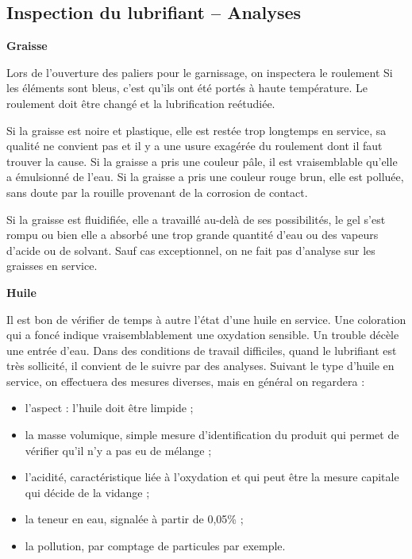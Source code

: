 \subsection{Inspection du lubrifiant – Analyses}

\vspace{0.3cm}
\textbf{	Graisse}
\vspace{0.3cm}

Lors de l’ouverture des paliers pour le garnissage, on inspectera le roulement
Si les éléments sont bleus, c’est qu’ils ont été portés à haute température. Le roulement doit être changé et la lubrification reétudiée.
\vspace{0.3cm}

Si la graisse est noire et plastique, elle est restée trop longtemps en service, sa qualité ne convient pas et il y a une usure exagérée du roulement dont il faut trouver la cause.
Si la graisse a pris une couleur pâle, il est vraisemblable qu’elle a émulsionné de l’eau.
Si la graisse a pris une couleur rouge brun, elle est polluée, sans doute par la rouille provenant de la corrosion de contact.
\vspace{0.3cm}

Si la graisse est fluidifiée, elle a travaillé au-delà de ses possibilités, le gel s’est rompu ou bien elle a absorbé une trop grande quantité d’eau ou des vapeurs d’acide ou de solvant.
Sauf cas exceptionnel, on ne fait pas d’analyse sur les graisses en service.


\vspace{0.3cm}
\textbf{	Huile }
\vspace{0.3cm}

Il est bon de vérifier de temps à autre l’état d’une huile en service. Une coloration qui a foncé indique vraisemblablement une oxydation sensible. Un trouble décèle une entrée d’eau.
Dans des conditions de travail difficiles, quand le lubrifiant est très sollicité, il convient de le suivre par des analyses. Suivant le type d’huile en service, on effectuera des mesures diverses, mais en général on regardera :

\begin{itemize}
\item  l’aspect : l’huile doit être limpide ;
\item  la masse volumique, simple mesure d’identification du produit qui permet de vérifier qu’il n’y a pas eu de mélange ;
\item  l’acidité, caractéristique liée à l’oxydation et qui peut être la mesure capitale qui décide de la vidange ;
\item  la teneur en eau, signalée à partir de 0,05\% ;
\item  la pollution, par comptage de particules par exemple.

\end{itemize}
 
